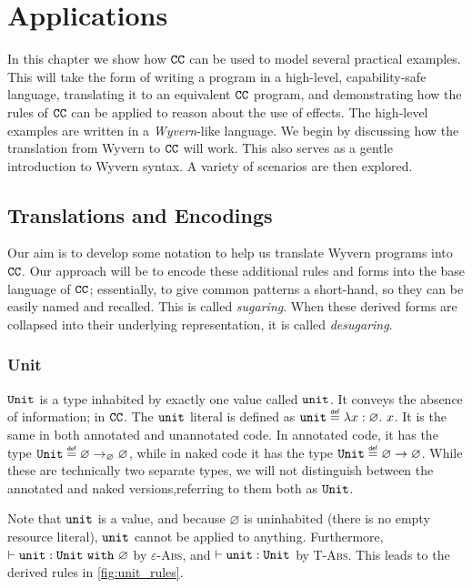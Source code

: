 
\chapter{Applications}

In this chapter we show how $\mathtt{CC}$ can be used to model several practical examples. This will take the form of writing a program in a high-level, capability-safe language, translating it to an equivalent $\mathtt{CC}$ program, and demonstrating how the rules of $\mathtt{CC}$ can be applied to reason about the use of effects. The high-level examples are written in a \textit{Wyvern}-like language. We begin by discussing how the translation from Wyvern to $\mathtt{CC}$ will work. This also serves as a gentle introduction to Wyvern syntax. A variety of scenarios are then explored.

\section{Translations and Encodings}

Our aim is to develop some notation to help us translate Wyvern programs into $\mathtt{CC}$. Our approach will be to encode these additional rules and forms into the base language of $\mathtt{CC}$; essentially, to give common patterns a short-hand, so they can be easily named and recalled. This is called \textit{sugaring}. When these derived forms are collapsed into their underlying representation, it is called \textit{desugaring}. 

\subsection{Unit}

$\mathtt{Unit}$ is a type inhabited by exactly one value called $\mathtt{unit}$. It conveys the absence of information; in $\mathtt{CC}$. The $\mathtt{unit}$ literal is defined as $\unit \defn \lambda x: \varnothing.~x$. It is the same in both annotated and unannotated code. In annotated code, it has the type $\Unit \defn \varnothing \rightarrow_{\varnothing} \varnothing$, while in naked code it has the type $\Unit \defn \varnothing \rightarrow \varnothing$. While these are technically two separate types, we will not distinguish between the annotated and naked versions,referring to them both as $\mathtt{Unit}$.

Note that $\mathtt{unit}$ is a value, and because $\varnothing$ is uninhabited (there is no empty resource literal), $\mathtt{unit}$ cannot be applied to anything. Furthermore, $\vdash \mathtt{unit}: \mathtt{Unit}~\mathtt{with}~ \varnothing$ by \textsc{$\varepsilon$-Abs}, and $\vdash \mathtt{unit}: \mathtt{Unit}$ by \textsc{T-Abs}. This leads to the derived rules in \ref{fig:unit_rules}.

